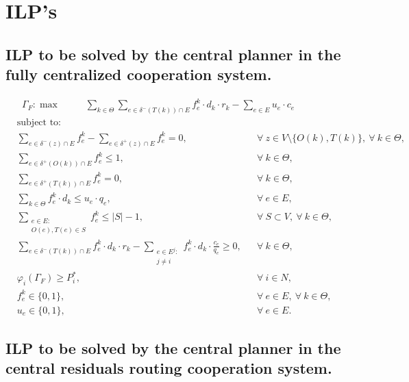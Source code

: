 \documentclass[authoryear]{elsarticle}
\begin{document}


\appendix
\section{ILP's}
\label{seq:appendixilp}

\subsection{ILP to be solved by the central planner in the fully centralized cooperation system.}

    \begin{align}
        &  \Gamma_F: \max  & \hspace{22pt} \sum_{k\in \Theta} \sum_{e \in \delta^-(T(k))\cap E}  f_e^k \cdot d_k \cdot r_k - \sum_{e\in E} u_{e}\cdot c_{e} \hspace{40pt} && 
    \end{align}
    \begin{align}
        & \text{subject to:}       && \nonumber \\
        & \sum_{e \in \delta^-(z)\cap E} f_e^k -\sum_{e \in \delta^+(z)\cap E} f_{e}^k = 0,\quad && \forall\ z\in V\setminus\{O(k),T(k)\},\ \forall\ k\in\Theta, \\
& \sum_{e \in \delta^+(O(k))\cap E} f_e^k \leq 1, && \forall\ k\in \Theta, \\
 & \sum_{e \in \delta^+(T(k))\cap E} f_e^k = 0,  && \forall\ k\in \Theta,  \\
& \sum_{k \in \Theta} f_e^k\cdot d_k  \leq u_e\cdot q_e, && \forall\ e \in E,   \\
 & \sum_{\substack{e \in E\colon \\ O(e),T(e) \in S}} f_e^k \leq |S| -1, && \forall\ S \subset V,\ \forall\ k \in \Theta,\\
&\sum_{e \in \delta^-(T(k))\cap E}  f_e^k  \cdot d_k \cdot r_k - \sum_{\substack{e \in E^j\colon \\ j\not = i}} f_e^k \cdot d_k \cdot \frac{c_e}{q_e}\geq 0, && \forall\ k \in \Theta, \\
& \varphi_i(\Gamma_F) \geq P_i^*,  && \forall\ i\in N, \\
& f_e^k \in \{0,1\},  && \forall\ e \in E,\ \forall\ k \in \Theta,  \\
&  u_e  \in \{0,1\},  && \forall\ e \in E.
   \end{align}

\subsection{ILP to be solved by the central planner in the central  residuals routing cooperation system.}
\end{document}
